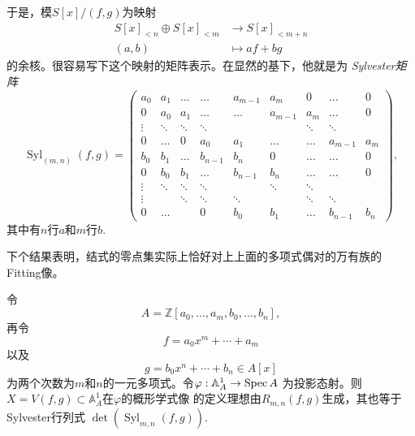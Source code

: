 
于是，模$S[x]/(f,g)$为映射
\[
    \begin{aligned}
        S[x]_{<n} \oplus S[x]_{<m} & \longrightarrow S[x]_{<m+n} \\
        (a, b) & \longmapsto a f+b g 
    \end{aligned}
\]
的余核。很容易写下这个映射的矩阵表示。在显然的基下，他就是为
\textit{Sylvester矩阵}
\[
    \operatorname{Syl}_{(m, n)}(f, g)=
    \begin{pmatrix}
        a_0 & a_1 & \ldots & \ldots & a_{m-1} & a_m & 0 & \ldots & 0 \\
        0 & a_0 & a_1 & \ldots & \ldots & a_{m-1} & a_m & \ldots & 0 \\
        \vdots & \ddots & \ddots & \ddots & & & \ddots & \ddots & \\
        0 & \ldots & 0 & a_0 & a_1 & \ldots & \ldots & a_{m-1} & a_m \\
        b_0 & b_1 & \ldots & b_{n-1} & b_n & 0 & \ldots & \ldots & 0 \\
        0 & b_0 & b_1 & \ldots & b_{n-1} & b_n & \ldots & \ldots & 0 \\
        \vdots & \ddots & \ddots & \ddots & & \ddots & \ddots & & \\
        \vdots & & \ddots & \ddots & \ddots & & \ddots & \ddots & \\
        0 & \ldots & & 0 & b_0 & b_1 & \ldots & b_{n-1} & b_n
    \end{pmatrix},
\]
其中有$n$行$a$和$m$行$b$.

下个结果表明，结式的零点集实际上恰好对上上面的多项式偶对的万有族的Fitting像。

\begin{thm}\label{thm:5.15}
    令
    \[
        A=\mathbb{Z}\left[a_0, \ldots, a_m, b_0, \ldots, b_n\right],
    \]
    再令
    \[
        f=a_0 x^m+\cdots+a_m
    \]
    以及
    \[
        g=b_0 x^n+\cdots+b_n \in A[x]
    \]
    为两个次数为$m$和$n$的一元多项式。令$\varphi:\mathbb A_A^1\to \operatorname{Spec} A$
    为投影态射。则$X=V(f,g)\subset \mathbb A_A^1$在$\varphi$的概形学式像
    的定义理想由$R_{m,n}(f,g)$生成，其也等于Sylvester行列式
    $\operatorname{det}\left(\operatorname{Syl}_{m, n}(f, g)\right)$.
\end{thm}

